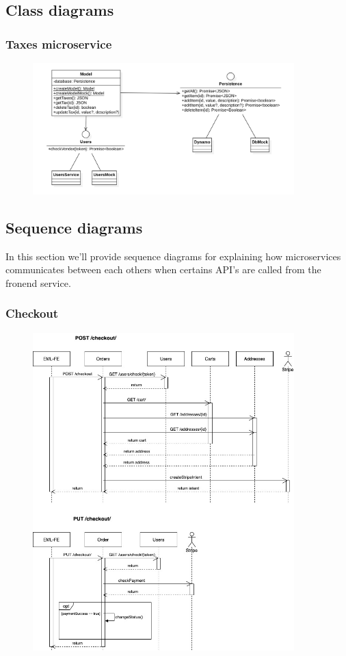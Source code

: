 \subsection{Class diagrams}
\subsubsection{Taxes microservice}
\begin{figure}[H]
    \includegraphics[width=0.9\textwidth]{res/images/class-diagrams/taxes.png}
\end{figure}

\subsection{Sequence diagrams}
In this section we'll provide sequence diagrams for explaining how microservices communicates between each others
when certains API's are called from the fronend service.

\subsubsection{Checkout}
\begin{figure}[H]
    \includegraphics[width=0.9\textwidth]{res/images/sequence-diagrams/checkout.jpg}
\end{figure}


